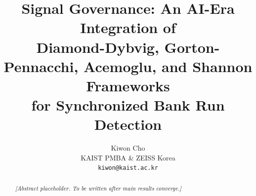 \documentclass[letterpaper]{article}
\title{Signal Governance: An AI-Era Integration of\\
Diamond-Dybvig, Gorton-Pennacchi, Acemoglu, and Shannon Frameworks\\
for Synchronized Bank Run Detection}
\author{
  Kiwon Cho\\
  KAIST PMBA \& ZEISS Korea\\
  \texttt{kiwon@kaist.ac.kr}
}
\date{}
\theoremstyle{plain}
\begin{document}
\maketitle

\begin{abstract}
\textit{[Abstract placeholder. To be written after main results converge.]}
\end{abstract}















\end{document}
